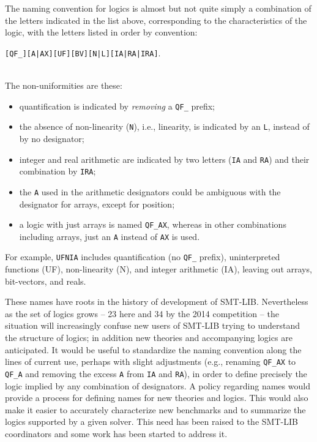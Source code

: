\documentclass[smallcondensed]{svjour3}
\begin{document}
The naming convention for logics is almost but not quite simply a combination of the letters indicated in the list above,
corresponding to the characteristics of the logic, with the letters listed in order by convention: \\
\centerline{{\tt [QF\_][A|AX][UF][BV][N|L][IA|RA|IRA]}.}\\
 The non-uniformities are these:
\begin{itemize}[noitemsep,nolistsep]
\item quantification is indicated by {\em removing} a {\tt QF\_} prefix;
\item the absence of non-linearity ({\tt N}), i.e., linearity, is indicated by an {\tt L}, instead of by no designator; 
\item integer and real arithmetic are indicated by two letters ({\tt IA} and {\tt RA}) and their combination by {\tt IRA}; \item the {\tt A} used in the arithmetic designators could be ambiguous with the designator for arrays, except for position;
\item a logic with just arrays is named {\tt QF\_AX}, whereas in other combinations including arrays, just an {\tt A} instead of {\tt AX} is used.
\end{itemize}
For example, {\tt UFNIA} includes quantification (no {\tt QF\_} prefix), uninterpreted functions (UF), non-linearity (N), and integer arithmetic (IA), leaving out arrays, bit-vectors, and reals.

These names have roots in the history of development of SMT-LIB. Nevertheless as the set of logics grows -- 23 here and 34 by the 2014 competition -- the situation will increasingly confuse new users of SMT-LIB trying to understand the structure of logics; in addition new theories and accompanying logics are anticipated.
It would be useful to standardize the naming convention along the lines of current use, perhaps with slight adjustments (e.g., renaming {\tt QF\_AX} to {\tt QF\_A} and removing the excess {\tt A} from {\tt IA} and {\tt RA}), in order to define precisely the logic implied by any combination of designators. A policy regarding names would provide a process for defining names for new theories and logics. This would
also make it easier to accurately characterize new benchmarks and to summarize the logics supported by a given solver. This need has been raised to the SMT-LIB coordinators and some work has been started to address it.
\end{document}
